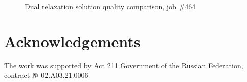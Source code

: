 \documentclass{../download/tPRS2e}
\begin{document}
\begin{figure}
    \begin{center}
    \caption{Dual relaxation solution quality comparison, job \#464} \label{quality}
    \end{center}
\end{figure}


\section*{Acknowledgements}

The work was supported by Act 211 Government of the Russian Federation, contract № 02.A03.21.0006


\nocite{*}

\end{document}
